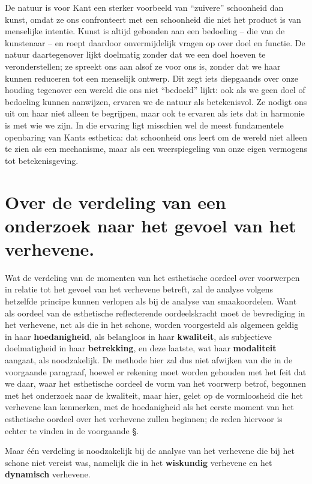 \begin{mdframed}[leftmargin=0pt,rightmargin=0pt,backgroundcolor=blue!6,linecolor=white,innertopmargin=6pt,innerbottommargin=6pt]
De natuur is voor Kant een sterker voorbeeld van “zuivere” schoonheid dan kunst, omdat ze ons confronteert met een schoonheid die niet het product is van menselijke intentie. Kunst is altijd gebonden aan een bedoeling – die van de kunstenaar – en roept daardoor onvermijdelijk vragen op over doel en functie. De natuur daartegenover lijkt doelmatig zonder dat we een doel hoeven te veronderstellen; ze spreekt ons aan alsof ze voor ons is, zonder dat we haar kunnen reduceren tot een menselijk ontwerp. Dit zegt iets diepgaands over onze houding tegenover een wereld die ons niet “bedoeld” lijkt: ook als we geen doel of bedoeling kunnen aanwijzen, ervaren we de natuur als betekenisvol. Ze nodigt ons uit om haar niet alleen te begrijpen, maar ook te ervaren als iets dat in harmonie is met wie we zijn. In die ervaring ligt misschien wel de meest fundamentele openbaring van Kants esthetica: dat schoonheid ons leert om de wereld niet alleen te zien als een mechanisme, maar als een weerspiegeling van onze eigen vermogens tot betekenisgeving.

\end{mdframed}

\section{Over de verdeling van een onderzoek naar het gevoel van het verhevene.}

Wat de verdeling van de momenten van het esthetische oordeel over voorwerpen in relatie tot het gevoel van het verhevene betreft, zal de analyse volgens hetzelfde principe kunnen verlopen als bij de analyse van smaakoordelen. Want als oordeel van de esthetische reflecterende oordeelskracht moet de bevrediging in het verhevene, net als die in het schone, worden voorgesteld als algemeen geldig in haar \textbf{hoedanigheid}, als belangloos in haar \textbf{kwaliteit}, als subjectieve doelmatigheid in haar \textbf{betrekking}, en deze laatste, wat haar \textbf{modaliteit} aangaat, als noodzakelijk. De methode hier zal dus niet afwijken van die in de voorgaande paragraaf, hoewel er rekening moet worden gehouden met het feit dat we daar, waar het esthetische oordeel de vorm van het voorwerp betrof, begonnen met het onderzoek naar de kwaliteit, maar hier, gelet op de vormloosheid die het verhevene kan kenmerken, met de hoedanigheid als het eerste moment van het esthetische oordeel over het verhevene zullen beginnen; de reden hiervoor is echter te vinden in de voorgaande §.

Maar één verdeling is noodzakelijk bij de analyse van het verhevene die bij het schone niet vereist was, namelijk die in het \textbf{wiskundig} verhevene en het \textbf{dynamisch} verhevene. 

